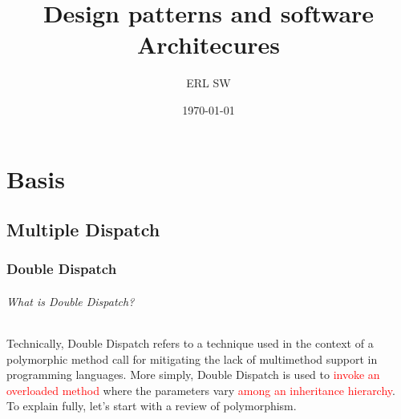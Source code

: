 \documentclass{book}
\begin{document}
\title{Design patterns and software Architecures}
\author{ERL SW}
\date{\today}
\maketitle


\tableofcontents
\part{Basis}
\chapter{Multiple Dispatch}\label{md}
\section{Double Dispatch}\label{dd}
\paragraph{What is Double Dispatch?}
Technically, Double Dispatch refers to a technique used in the context of a polymorphic method call for mitigating the lack of multimethod support in programming languages.
More simply, Double Dispatch is used to \textcolor{red}{invoke an overloaded method} where the parameters vary \textcolor{red}{among an inheritance hierarchy}.
To explain fully, let’s start with a review of polymorphism.
 
\end{document}
